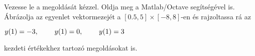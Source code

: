 Vezesse le a 
\de{} megoldását kézzel. 
Oldja meg a Matlab/Octave   segítségével is. 
Ábrázolja az egyenlet vektormezejét a $[0.5,5]\times [-8,8]$-en és rajzoltassa rá 
az 
\centerline{$y(1)=-3, \hspace{0.8cm} y(1)=0, \hspace{0.8cm} y(1)=3$} 
kezdeti értékekhez tartozó megoldásokat is.


